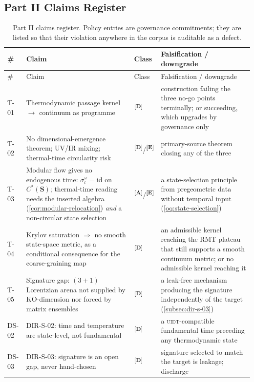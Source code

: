 \documentclass[12pt,a4paper,twoside]{article}
\theoremstyle{plain}
\theoremstyle{definition}
\theoremstyle{remark}
\newcommand{\UIDT}{\textsc{uidt}}
\newcommand{\catmark}[1]{\textsuperscript{\textsf{\textbf{[#1]}}}}
\begin{document}
\subsection{Part II Claims Register}
\label{subsec:part2-claims}

{\footnotesize
\begin{longtable}{@{}p{}p{}p{}p{}@{}}
\caption{Part II claims register. Policy entries are governance commitments; they are listed so that their violation anywhere in the corpus is auditable as a defect.}\label{tab:part2-claims}\\
\toprule
\# & Claim & Class & Falsification / downgrade \\
\midrule
\endfirsthead
\toprule
\# & Claim & Class & Falsification / downgrade \\
\midrule
\endhead
\bottomrule
\endfoot
T-01 & Thermodynamic passage kernel $\to$ continuum as programme &
\catmark{D} & construction failing the three no-go points terminally;
or succeeding, which upgrades by governance only \\
T-02 & No dimensional-emergence theorem; UV/IR mixing; thermal-time
circularity risk & \catmark{D}/\catmark{E} & primary-source theorem
closing any of the three \\
T-03 & Modular flow gives no endogenous time: $\sigma^\omega_t=\mathrm{id}$
on $C^\ast(\mathbf S)$; thermal-time reading needs the inserted algebra
(\cref{cor:modular-relocation}) \emph{and} a non-circular state selection &
\catmark{A}/\catmark{E} & a state-selection principle from pregeometric
data without temporal input (\cref{oq:state-selection}) \\
T-04 & Krylov saturation $\Rightarrow$ no smooth state-space metric, as a
conditional consequence for the coarse-graining map & \catmark{D} & an
admissible kernel reaching the RMT plateau that still supports a smooth
continuum metric; or no admissible kernel reaching it \\
T-05 & Signature gap: $(3{+}1)$ Lorentzian arena not supplied by
$\mathrm{KO}$-dimension nor forced by matrix ensembles & \catmark{D} &
a leak-free mechanism producing the signature independently of the target
(\cref{subsec:dir-s-03}) \\
DS-02 & DIR-S-02: time and temperature are state-level, not fundamental &
\catmark{D} & a \UIDT-compatible fundamental time preceding any
thermodynamic state \\
DS-03 & DIR-S-03: signature is an open gap, never hand-chosen &
\catmark{D} & signature selected to match the target is leakage; discharge

\end{longtable}}
\end{document}

